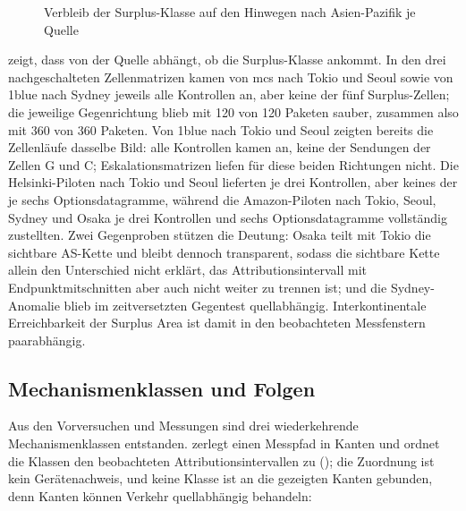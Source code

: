 \begin{figure}[H]
    \centering
    
    \caption[Verbleib der Surplus-Klasse nach Asien-Pazifik]{Verbleib der Surplus-Klasse auf den
      Hinwegen nach Asien-Pazifik je Quelle}
    \label{fig:eval-opfermatrix}
\end{figure}

 zeigt, dass von der Quelle abhängt, ob die Surplus-Klasse ankommt. In
den drei nachgeschalteten Zellenmatrizen kamen von mcs nach Tokio und Seoul sowie von 1blue nach
Sydney jeweils alle Kontrollen an, aber keine der fünf Surplus-Zellen; die jeweilige Gegenrichtung blieb
mit 120 von 120
Paketen sauber, zusammen also mit 360 von 360 Paketen. Von 1blue nach Tokio und Seoul zeigten bereits die
Zellenläufe dasselbe Bild: alle Kontrollen kamen an, keine der Sendungen der Zellen G und C;
Eskalationsmatrizen liefen für diese beiden Richtungen nicht. Die Helsinki-Piloten nach Tokio und Seoul
lieferten je drei Kontrollen, aber keines der je sechs Optionsdatagramme, während die Amazon-Piloten
nach Tokio, Seoul, Sydney und Osaka je drei Kontrollen und sechs Optionsdatagramme vollständig
zustellten. Zwei Gegenproben stützen die Deutung: Osaka teilt mit Tokio die sichtbare AS-Kette und
bleibt dennoch transparent, sodass die sichtbare Kette allein den Unterschied nicht erklärt, das
Attributions\-intervall mit Endpunktmitschnitten aber auch nicht weiter zu trennen ist; und die
Sydney-Anomalie
blieb im zeitversetzten Gegentest quellabhängig. Interkontinentale Erreichbarkeit der Surplus Area ist
damit in den beobachteten Messfenstern paarabhängig.

\subsection{Mechanismenklassen und Folgen}
\label{subsec:eval-mechanismen}

Aus den Vorversuchen und Messungen sind drei wiederkehrende Mechanismenklassen entstanden.
 zerlegt einen Messpfad in Kanten und ordnet die
Klassen den beobachteten Attributions\-intervallen zu (); die Zuordnung ist kein
Gerätenachweis, und keine Klasse ist an die gezeigten Kanten gebunden, denn Kanten können Verkehr
quellabhängig behandeln:


